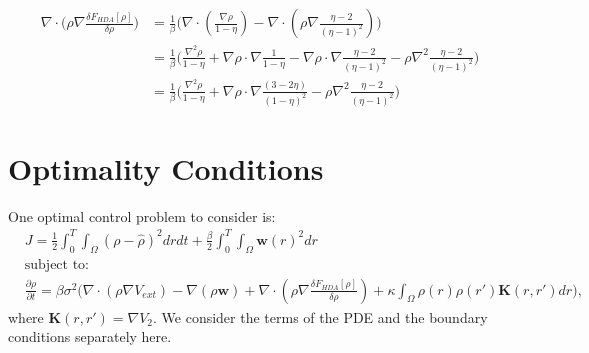 \documentclass[11pt, a4paper]{article}
\theoremstyle{definition}
\newcommand{\w}{\mathbf{w}}
\newcommand{\K}{\mathbf{K}}
\begin{document}
\begin{align*}
	\nabla \cdot \bigg(\rho \nabla \frac{\delta F_{HDA}[\rho]}{\delta \rho}\bigg) &= \frac{1}{\beta} \bigg( \nabla  \cdot \left(  \frac{\nabla \rho}{1 - \eta} \right) - \nabla  \cdot \left(\rho \nabla\frac{\eta - 2}{(\eta - 1)^2} \right) \bigg)\\
	&= \frac{1}{\beta} \bigg( \frac{\nabla^2 \rho}{1 - \eta} +  \nabla \rho \cdot \nabla \frac{1}{1 - \eta} - \nabla \rho \cdot \nabla \frac{\eta - 2}{(\eta - 1)^2} - \rho \nabla^2\frac{\eta - 2}{(\eta - 1)^2} \bigg)\\
	&= \frac{1}{\beta} \bigg( \frac{\nabla^2 \rho}{1 - \eta} +  \nabla \rho \cdot \nabla \frac{(3- 2 \eta)}{(1 - \eta)^2}  - \rho \nabla^2\frac{\eta - 2}{(\eta - 1)^2} \bigg)
\end{align*}

\section{Optimality Conditions}
One optimal control problem to consider is:
\begin{align*}
	&J = \frac{1}{2}\int_0^T \int_\Omega (\rho - \widehat \rho)^2 dr dt + \frac{\beta}{2} \int_0^T\int_\Omega \w(r)^2 dr\\
	&\text{subject to:}\\
	&\frac{\partial \rho}{\partial t} = \beta \sigma^2 \bigg( \nabla \cdot (\rho \nabla V_{ext}) - \nabla (\rho \w) + \nabla \cdot \left(\rho \nabla \frac{\delta F_{HDA}[\rho]}{\delta \rho}\right) + \kappa \int_\Omega \rho(r) \rho(r') \K(r,r')dr\bigg),
\end{align*}
where $\K(r,r') = \nabla V_2$.
We consider the terms of the PDE and the boundary conditions separately here.
\end{document}
